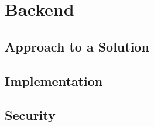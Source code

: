 \chapter{Backend}

\section{Approach to a Solution}
\lipsum

\section{Implementation}
\lipsum

\section{Security}
\lipsum